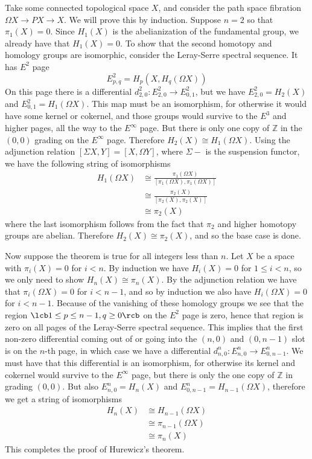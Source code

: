 Take some connected topological space $X$, and consider the path space fibration $\Omega X \rightarrow PX \rightarrow X$. We will prove this by induction. Suppose $n=2$ so that $\pi_1(X)=0$. Since $H_1(X)$ is the abelianization of the fundamental group, we already have that $H_1(X)=0$. To show that the second homotopy and homology groups are isomorphic, consider the Leray-Serre spectral sequence. It has $E^2$ page
\[ E_{p,q}^2 = H_p(X,H_q(\Omega X)) \]
On this page there is a differential $d_{2,0}^2 : E_{2,0}^2 \rightarrow E_{0,1}^2$, but we have $E_{2,0}^2 = H_2(X)$ and $E_{0,1}^2 = H_1(\Omega X)$. This map must be an isomorphism, for otherwise it would have some kernel or cokernel, and those groups would survive to the $E^3$ and higher pages, all the way to the $E^\infty$ page. But there is only one copy of $\mathbb Z$ in the $(0,0)$ grading on the $E^\infty$ page. Therefore $H_2(X) \cong H_1(\Omega X)$. Using the adjunction relation $[\Sigma X,Y] = [X,\Omega Y]$, where $\Sigma-$ is the suspension functor, we have the following string of isomorphisms
\begin{align*}
	H_1(\Omega X) &\cong \frac{\pi_1(\Omega X)}{[\pi_1(\Omega X),\pi_1(\Omega X)]} \\
	              &\cong \frac{\pi_2(X)}{[\pi_2(X),\pi_2( X)]} \\
	              &\cong \pi_2(X)
\end{align*}
where the last isomorphism follows from the fact that $\pi_2$ and higher homotopy groups are abelian. Therefore $H_2(X) \cong \pi_2(X)$, and so the base case is done.

Now suppose the theorem is true for all integers less than $n$. Let $X$ be a space with $\pi_i(X) = 0$ for $i < n$. By induction we have $H_i(X) = 0$ for $1 \leq i < n$, so we only need to show $H_n(X) \cong \pi_n(X)$. By the adjunction relation we have that $\pi_i(\Omega X) = 0$ for $i < n-1$, and so by induction we also have $H_i(\Omega X)=0$ for $i < n-1$. Because of the vanishing of these homology groups we see that the region $\lcb 1 \leq p \leq n-1, q \geq 0 \rcb$ on the $E^2$ page is zero, hence that region is zero on all pages of the Leray-Serre spectral sequence. This implies that the first non-zero differential coming out of or going into the $(n,0)$ and $(0,n-1)$ slot is on the $n$-th page, in which case we have a differential $d_{n,0}^n : E_{n,0}^n \rightarrow E_{0,n-1}^n$. We must have that this differential is an isomorphism, for otherwise its kernel and cokernel would survive to the $E^\infty$ page, but there is only the one copy of $\mathbb Z$ in grading $(0,0)$. But also $E_{n,0}^n = H_n(X)$ and $E_{0,n-1}^n=H_{n-1}(\Omega X)$, therefore we get a string of isomorphisms
\begin{align*}
	H_n(X) &\cong H_{n-1}(\Omega X) \\
	       &\cong \pi_{n-1}(\Omega X) \\
	       &\cong \pi_n(X)
\end{align*}
This completes the proof of Hurewicz's theorem.



